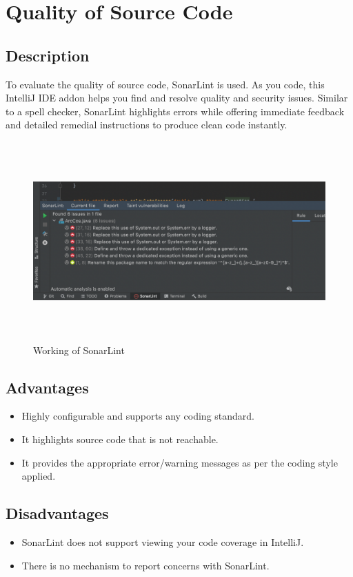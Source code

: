 \documentclass{article}
\begin{document}
    \section{Quality of Source Code}

    \subsection{Description}
    To evaluate the quality of source code, SonarLint is used. As you code, this IntelliJ IDE addon helps you find and resolve quality and security issues. Similar to a spell checker, SonarLint highlights errors while offering immediate feedback and detailed remedial instructions to produce clean code instantly.
    \begin{figure}[hbt!]
        \centering
        \includegraphics[width=5.0in,height=3.0in]{Images/Sonarlint.png}
        \caption{Working of SonarLint}
        \label{fig:Speed vs. Torque from Pittman}
    \end{figure}

    \subsection{Advantages}
    \begin{itemize}
        \item Highly configurable and supports any coding standard.
        \item It highlights source code that is not reachable.
        \item It provides the appropriate error/warning messages as per the coding style applied.
    \end{itemize}

    \subsection{Disadvantages}
    \begin{itemize}
        \item SonarLint does not support viewing your code coverage in IntelliJ.
        \item There is no mechanism to report concerns with SonarLint.
    \end{itemize}
\end{document}

